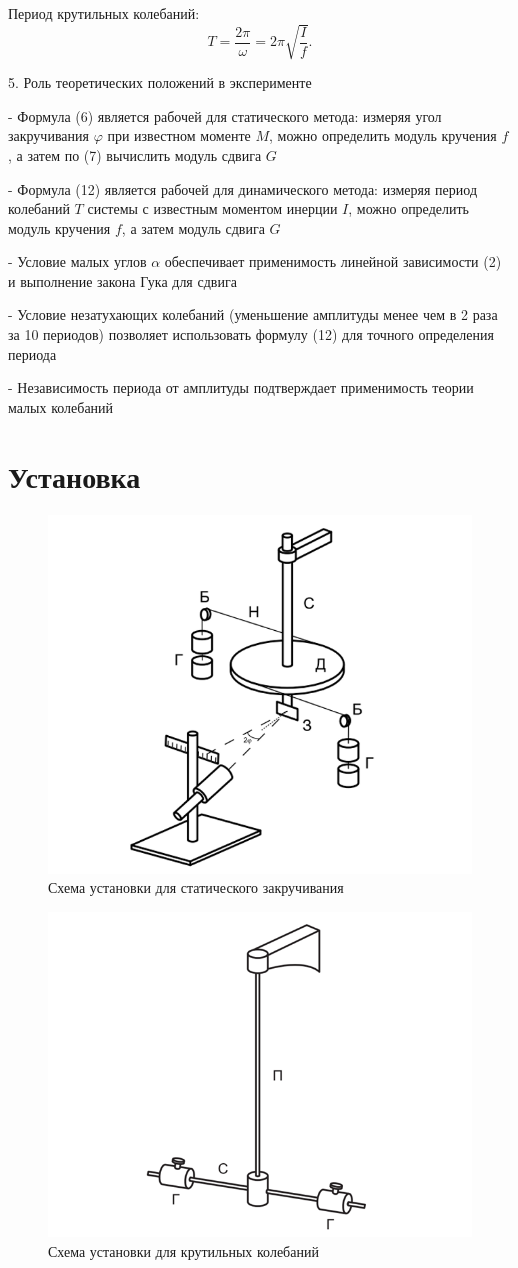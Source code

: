 \documentclass[a4paper, 12pt]{article}
\begin{document}
Период крутильных колебаний:
\[
T = \frac{2\pi}{\omega} = 2\pi \sqrt{\frac{I}{f}}.\tag{12}
\]


5. Роль теоретических положений в эксперименте

- Формула (6) является рабочей для статического метода: измеряя угол закручивания \( \varphi \) при известном моменте \( M \), можно определить модуль кручения \( f \), а затем по (7) вычислить модуль сдвига \( G \)

- Формула (12) является рабочей для динамического метода: измеряя период колебаний \( T \) системы с известным моментом инерции \( I \), можно определить модуль кручения \( f \), а затем модуль сдвига \( G \)

- Условие малых углов \( \alpha \) обеспечивает применимость линейной зависимости (2) и выполнение закона Гука для сдвига

- Условие незатухающих колебаний (уменьшение амплитуды менее чем в 2 раза за 10 периодов) позволяет использовать формулу (12) для точного определения периода

- Независимость периода от амплитуды подтверждает применимость теории малых колебаний

\section{Установка}


\begin{figure}[h]
\centering
\includegraphics[width=0.4\linewidth]{схема установки1.png}
\caption{Схема установки для статического закручивания }
\label{fig:voltage_current}
\end{figure}

\begin{figure}[h]
\centering
\includegraphics[width=0.4\linewidth]{схема установки2.png}
\caption{Схема установки для крутильных колебаний }
\label{fig:voltage_current}
\end{figure}
\end{document}
